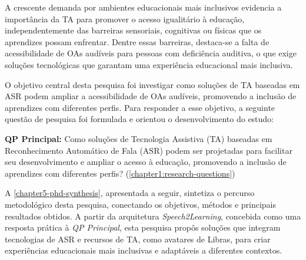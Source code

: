 A crescente demanda por ambientes educacionais mais inclusivos evidencia a importância da TA para promover o acesso igualitário à educação, independentemente das barreiras sensoriais, cognitivas ou físicas que os aprendizes possam enfrentar. Dentre essas barreiras, destaca-se a falta de acessibilidade de OAs audíveis para pessoas com deficiência auditiva, o que exige soluções tecnológicas que garantam uma experiência educacional mais inclusiva.

O objetivo central desta pesquisa foi investigar como soluções de TA baseadas em ASR podem ampliar a acessibilidade de OAs audíveis, promovendo a inclusão de aprendizes com diferentes perfis. Para responder a esse objetivo, a seguinte questão de pesquisa foi formulada e orientou o desenvolvimento do estudo:

\begin{citacao}
\textbf{QP Principal:} Como soluções de Tecnologia Assistiva (TA) baseadas em Reconhecimento Automático de Fala (ASR) podem ser projetadas para facilitar seu desenvolvimento e ampliar o acesso à educação, promovendo a inclusão de aprendizes com diferentes perfis? (\autoref{chapter1:research-questions})
\end{citacao}

A \autoref{chapter5-phd-synthesis}, apresentada a seguir, sintetiza o percurso metodológico desta pesquisa, conectando os objetivos, métodos e principais resultados obtidos. A partir da arquitetura \textit{Speech2Learning}, concebida como uma resposta prática à \textit{QP Principal}, esta pesquisa propôs soluções que integram tecnologias de ASR e recursos de TA, como avatares de Libras, para criar experiências educacionais mais inclusivas e adaptáveis a diferentes contextos.

